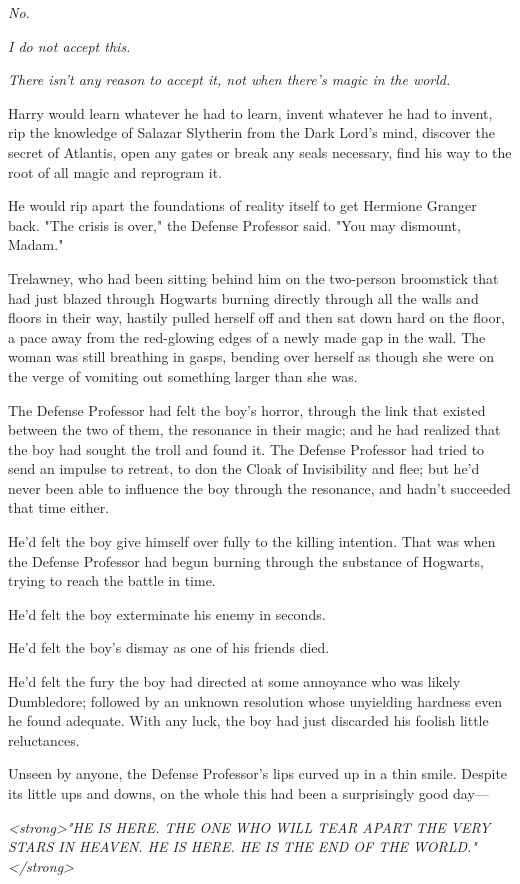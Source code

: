 \emph{No.}

\emph{I do not accept this.}

\emph{There isn't any reason to accept it, not when there's magic in the world.}

Harry would learn whatever he had to learn, invent whatever he had to invent, 
rip the knowledge of Salazar Slytherin from the Dark Lord's mind, discover the 
secret of Atlantis, open any gates or break any seals necessary, find his way 
to the root of all magic and reprogram it.

He would rip apart the foundations of reality itself to get Hermione Granger 
back.
\sbreak
"The crisis is over," the Defense Professor said. "You may dismount, Madam."

Trelawney, who had been sitting behind him on the two-person broomstick that 
had just blazed through Hogwarts burning directly through all the walls and 
floors in their way, hastily pulled herself off and then sat down hard on the 
floor, a pace away from the red-glowing edges of a newly made gap in the wall. 
The woman was still breathing in gasps, bending over herself as though she were 
on the verge of vomiting out something larger than she was.

The Defense Professor had felt the boy's horror, through the link that existed 
between the two of them, the resonance in their magic; and he had realized that 
the boy had sought the troll and found it. The Defense Professor had tried to 
send an impulse to retreat, to don the Cloak of Invisibility and flee; but he'd 
never been able to influence the boy through the resonance, and hadn't 
succeeded that time either.

He'd felt the boy give himself over fully to the killing intention. That was 
when the Defense Professor had begun burning through the substance of Hogwarts, 
trying to reach the battle in time.

He'd felt the boy exterminate his enemy in seconds.

He'd felt the boy's dismay as one of his friends died.

He'd felt the fury the boy had directed at some annoyance who was likely 
Dumbledore; followed by an unknown resolution whose unyielding hardness even he 
found adequate. With any luck, the boy had just discarded his foolish little 
reluctances.

Unseen by anyone, the Defense Professor's lips curved up in a thin smile. 
Despite its little ups and downs, on the whole this had been a surprisingly 
good day---

\emph{<strong>"HE IS HERE. THE ONE WHO WILL TEAR APART THE VERY STARS IN 
HEAVEN. HE IS HERE. HE IS THE END OF THE WORLD."</strong>}

